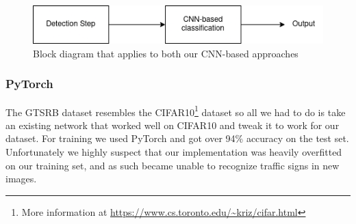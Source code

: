 \documentclass[conference]{IEEEtran}
\begin{document}
\begin{figure}[H]
    \includegraphics[width=\linewidth]{Classification-Diagram}
    \caption{Block diagram that applies to both our CNN-based approaches}
\end{figure}

\subsubsection{PyTorch}
The GTSRB dataset resembles the CIFAR10\footnote{More information at \url{https://www.cs.toronto.edu/~kriz/cifar.html}}
dataset so all we had to do is take an existing network that worked well on CIFAR10
and tweak it to work for our dataset. For training we used PyTorch\cite{Paszke_PyTorch_An_Imperative_2019} and got over
94\% accuracy on the test set. Unfortunately we highly suspect that our implementation
was heavily overfitted on our training set, and as such became unable to recognize traffic signs
in new images.
\end{document}
